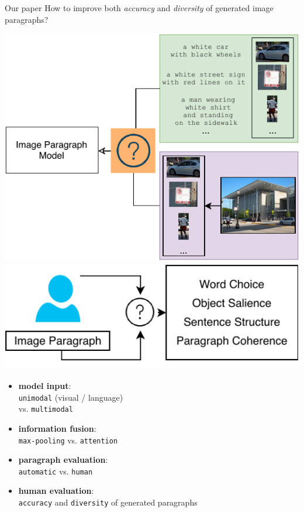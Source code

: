 \documentclass[notes=hide]{beamer}
\begin{document}
\begin{frame}{Our paper}
\small
{How to improve both \textit{accuracy} and \textit{diversity} of generated image paragraphs?}
\begin{minipage}{0.2\textwidth}
\vspace{.5cm}
\includegraphics[width=2.5\textwidth]{hyp}
\includegraphics[width=2.5\textwidth]{human}
\end{minipage} \hfill
\begin{minipage}{0.5\textwidth}
\vspace{.5cm}
\begin{itemize}
\item \textbf{model input}:\\ \texttt{unimodal} (visual / language)\\ vs. \texttt{multimodal}
\item \textbf{information fusion}:\\ \texttt{max-pooling} vs. \texttt{attention}
\item \textbf{paragraph evaluation}:\\ \texttt{automatic} vs. \texttt{human}
\pause
\item \textbf{human evaluation}:\\ \texttt{accuracy} and \texttt{diversity} of generated paragraphs
\end{itemize}
\end{minipage}
\end{frame}
\end{document}
